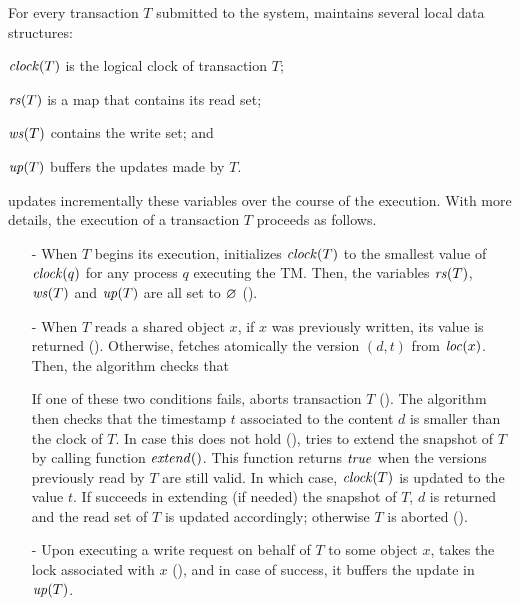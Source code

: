 For every transaction $T$ submitted to the system,  maintains several local data structures:
\begin{inparaenumorig}[]
\item $\clockOf{T}$ is the logical clock of transaction $T$;
\item $\readSetOf{T}$ is a map that contains its read set;
\item $\writeSetOf{T}$ contains the write set; and
\item $\updateSetOf{T}$ buffers the updates made by $T$.
\end{inparaenumorig}
 updates incrementally these variables over the course of the execution.
With more details, the execution of a transaction $T$ proceeds as follows.
\begin{itemize}
\item[-] %
  When $T$ begins its execution,  initializes $\clockOf{T}$ to the smallest value of $\clockOf{q}$ for any process $q$ executing the TM.
  Then, the variables $\readSetOf{T}$, $\writeSetOf{T}$ and $\updateSetOf{T}$ are all set to $\emptySet$ ().
\item[-] %
  When $T$ reads a shared object $x$, if $x$ was previously written, its value is returned ().
  Otherwise,  fetches atomically the version $(d,t)$ from $\locationOf{x}$.
  Then, the algorithm checks that 
  If one of these two conditions fails,  aborts transaction $T$ ().
  The algorithm then checks that the timestamp $t$ associated to the content $d$ is smaller than the clock of $T$.
  In case this does not hold (),  tries to extend the snapshot of $T$ by calling function $\stmExtend{}$.
  This function returns $\true$ when the versions previously read by $T$ are still valid.
  In which case, $\clockOf{T}$ is updated to the value $t$.
  If  succeeds in extending (if needed) the snapshot of $T$, $d$ is returned and the read set of $T$ is updated accordingly;
  otherwise $T$ is aborted ().
\item[-] %
  Upon executing a write request on behalf of $T$ to some object $x$,  takes the lock associated with $x$ (), and in case of success, it buffers the update in $\updateSetOf{T}$.

\end{itemize}
